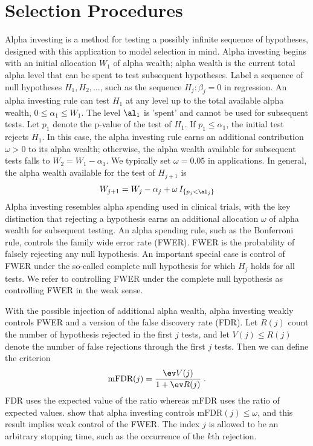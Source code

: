 \documentclass[12pt]{article}
\begin{document}
\section{ Selection Procedures }

 Alpha investing \citep{fosterstine08} is a method for testing a possibly
 infinite sequence of hypotheses, designed with this application to model
 selection in mind.  Alpha investing begins with an initial allocation $W_1$ of
 alpha wealth; alpha wealth is the current total alpha level that can be spent
 to test subsequent hypotheses.  Label a sequence of null hypotheses $H_1, H_2,
 \ldots$, such as the sequence $H_j: \beta_j=0$ in regression.  An alpha
 investing rule can test $H_1$ at any level up to the total available alpha
 wealth, $0 \le \alpha_1 \le W_1$.  The level $\al_1$ is 'spent' and cannot be
 used for subsequent tests.  Let $p_1$ denote the p-value of the test of $H_1$.
  If $p_1 \le \alpha_1$, the initial test rejects $H_1$.  In this case, the
 alpha investing rule earns an additional contribution $\omega >
 0$ \marginpar{$\omega$} to its alpha wealth; otherwise, the alpha wealth
 available for subsequent tests falls to $W_2 = W_1 - \alpha_1$.  We typically
 set $\omega = 0.05$ in applications.  In general, the alpha wealth available for
 the test of $H_{j+1}$ is 
 \begin{equation}
    W_{j+1} = W_j - \alpha_j + \omega \, I_{\{p_j < \al_j\}}
 \label{eq:Wj}
 \end{equation}
 Alpha investing resembles alpha spending used in clinical trials, with the key
 distinction that rejecting a hypothesis earns an additional allocation $\omega$
 of alpha wealth for subsequent testing.  An alpha spending rule, such as the
 Bonferroni rule, controls the family wide error rate (FWER).  FWER is the
 probability of falsely rejecting any null hypothesis.  An important special
 case is control of FWER under the so-called complete null hypothesis for which
 $H_j$ holds for all tests.  We refer to controlling FWER under the complete
 null hypothesis as controlling FWER in the weak sense.  


 With the possible injection of additional alpha wealth, alpha investing weakly
 controls FWER and a version of the false discovery rate (FDR).  Let $R(j)$
 count the number of hypothesis rejected in the first $j$ tests, and let $V(j)
 \le R(j)$ denote the number of false rejections through the first $j$ tests.
  Then we can define the criterion
 \begin{equation}
    \mbox{mFDR}(j) = \frac{\ev V(j)}{1+\ev R(j)} \;.
 \label{eq:mFDR}
 \end{equation}
 FDR uses the expected value of the ratio whereas mFDR uses the ratio of
 expected values.  \citet{fosterstine08} show that alpha investing controls
 $\mbox{mFDR}(j) \le \omega$, and this result implies weak control of the FWER.
  The index $j$ is allowed to be an arbitrary stopping time, such as the
 occurrence of the $k$th rejection.
\end{document}
